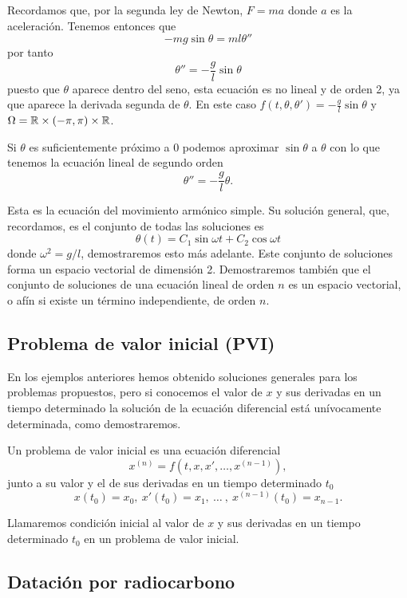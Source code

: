 \documentclass[../ecuaciones_diferenciales.tex]{subfiles}
\begin{document}
Recordamos que, por la segunda ley de Newton, \(F = ma\) donde \(a\) es la 
aceleración. Tenemos entonces que
\[-m g \sin\theta = m l \theta''\]
por tanto
\[\theta'' = -\frac{g}{l} \sin\theta\]
puesto que \(\theta\) aparece dentro del seno, esta ecuación es no lineal y de
orden 2, ya que aparece la derivada segunda de \(\theta\). En este caso
\(f(t, \theta, \theta') = -\frac{g}{l} \sin\theta\) y \(\Omega = \mathbb{R} \times
(-\pi, \pi) \times \mathbb{R}\). 

Si \(\theta\) es suficientemente próximo a \(0\) podemos aproximar 
\(\sin\theta\) a \(\theta\) con lo que tenemos la ecuación
lineal de segundo orden
\[\theta'' = -\frac{g}{l}\theta.\]

Esta es la ecuación del movimiento armónico simple. Su solución general, que,
recordamos, es el conjunto de todas las soluciones es
\[\theta(t) = C_1 \sin \omega t + C_2 \cos \omega t\]
donde \(\omega^2 = g/l\), demostraremos esto más adelante. Este conjunto de
soluciones forma un espacio vectorial de dimensión 2. Demostraremos también que
el conjunto de soluciones de una ecuación lineal de orden \(n\) es un espacio
vectorial, o afín si existe un término independiente, de orden \(n\).

\subsection{Problema de valor inicial (PVI)}

En los ejemplos anteriores hemos obtenido soluciones generales para los
problemas propuestos, pero si conocemos el valor de \(x\) y sus derivadas en un
tiempo determinado la solución de la ecuación diferencial está
unívocamente determinada, como demostraremos.

\begin{definition}
	Un problema de valor inicial es una ecuación diferencial
	\[x^{(n)} = f(t, x, x', \dots, x^{(n - 1)}),\]
	junto a su valor y el de sus derivadas en un tiempo determinado \(t_0\)
	\[x(t_0) = x_0,\ x'(t_0) = x_1,\ \dots\ ,\ x^{(n - 1)}(t_0) = x_{n - 1}.\]
\end{definition}

\begin{definition}
	Llamaremos condición inicial al valor de \(x\) y sus derivadas en un tiempo
	determinado \(t_0\) en un problema de valor inicial.
\end{definition}

\subsection{Datación por radiocarbono}
\end{document}

